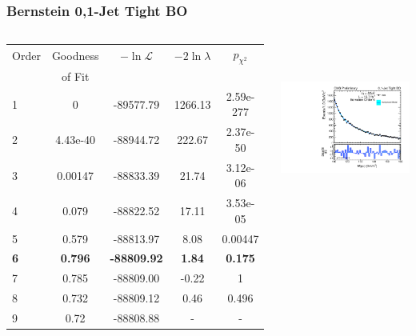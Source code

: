 \documentclass{beamer}
\begin{document}
\begin{frame}
\frametitle{Bernstein 0,1-Jet Tight BO}
  \begin{columns}[c]
   \column{60mm}
      \begin{center}
      \tiny
\begin{tabular}{|l|c|c|c|c|} \hline
Order & Goodness & $-\ln\mathcal{L}$ & $-2\ln\lambda$ & $p_{\chi^2}$ \\ 
 & of Fit  &  & &  \\ \hline \hline
1 & 0 & -89577.79 & 1266.13 & 2.59e-277  \\ \hline
2 & 4.43e-40 & -88944.72 & 222.67 & 2.37e-50  \\ \hline
3 & 0.00147 & -88833.39 & 21.74 & 3.12e-06  \\ \hline
4 & 0.079 & -88822.52 & 17.11 & 3.53e-05  \\ \hline
5 & 0.579 & -88813.97 & 8.08 & 0.00447  \\ \hline
\bf 6 & \bf 0.796 & \bf -88809.92 & \bf 1.84 & \bf 0.175  \\ \hline
7 & 0.785 & -88809.00 & -0.22 & 1  \\ \hline
8 & 0.732 & -88809.12 & 0.46 & 0.496  \\ \hline
9 & 0.72 & -88808.88 & - & -  \\ \hline
\end{tabular}
\\
\normalsize
\vspace{2em}
\bf
      \end{center}
   \column{60mm}
      \begin{center}
        \includegraphics[height=55mm]{wholeRangeHggStudy1/plotsOrderStudyPolysHighOrders/order_Shape_Jets01PassPtG10BO_Bernstein6}
      \end{center}
  \end{columns}
  \begin{center}
  \end{center}
\end{frame}
\end{document}
